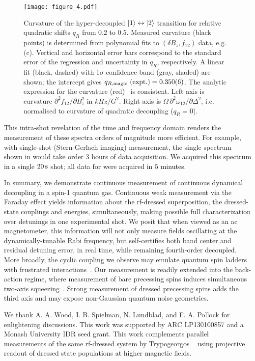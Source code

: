\documentclass[aps,prl,reprint,superscriptaddress,floatfix]{revtex4-1}
\begin{document}
\begin{figure}
    \texttt{[image: figure\_4.pdf]}
    \caption{
    \label{fig:curvature_vs_qR}
        Curvature of the hyper-decoupled $\vert 1 \rangle  \leftrightarrow \vert 2 \rangle $ transition for relative quadratic shifts $q_R$ from $0.2$ to $0.5$.
        Measured curvature (black points) is determined from polynomial fits to $(\delta B_z, f_{12})$ data, e.g. (c).
        Vertical and horizontal error bars correspond to the standard error of the regression and uncertainty in $q_R$, respectively.
        A linear fit (black, dashed) with 1$\sigma$ confidence band (gray, shaded) are shown; the intercept gives $q_{R,\text{magic}}\text{ (expt.)} = 0.350(6)$.
        The analytic expression for the curvature (red)~\cite{Note1} is consistent.
        Left axis is curvature $\partial^2 f_{12}/\partial B_z^2$ in  $\unit{kHz/G^2}$.
        Right axis is $\Omega\, \partial^2\omega_{12}/\partial \Delta^2$, i.e. normalised to curvature of quadratic decoupling ($q_R=0$).
    }
\end{figure}

This intra-shot revelation of the time and frequency domain renders the measurement of these spectra orders of magnitude more efficient.
For example, with single-shot (Stern-Gerlach imaging) measurement, the single spectrum shown in  would take order 3 hours of data acquisition.
We acquired this spectrum in a single $\unit[20]{s}$ shot; all data for  were acquired in $5$ minutes.

In summary, we demonstrate continuous measurement of continuous dynamical decoupling in a spin-1 quantum gas.
Continuous weak measurement via the Faraday effect yields information about the rf-dressed superposition, the dressed-state couplings and energies, simultaneously, making possible full characterization over detunings in one experimental shot.
We posit that when viewed as an ac magnetometer, this information will not only measure fields oscillating at the dynamically-tunable Rabi frequency, but self-certifies both band center and residual detuning error, in real time, while remaining fourth-order decoupled.
More broadly, the cyclic coupling we observe may emulate quantum spin ladders with frustrated interactions~\cite{mikeska_one-dimensional_2004}.
Our measurement is readily extended into the back-action regime, where
measurement of bare precessing spins induces simultaneous two-axis squeezing~\cite{colangelo_simultaneous_2017}.
Strong measurement of dressed precessing spins adds the third axis and may expose non-Gaussian quantum noise geometries.

We thank A. A. Wood, I. B. Spielman, N. Lundblad, and F. A. Pollock for enlightening discussions.
This work was supported by ARC LP130100857 and a Monash University IDR seed grant. 
This work complements parallel measurements of the same rf-dressed system by Trypogeorgos \etal~\cite{trypogeorgos_synthetic_2017} using projective readout of dressed state populations at higher magnetic fields.


\end{document}
